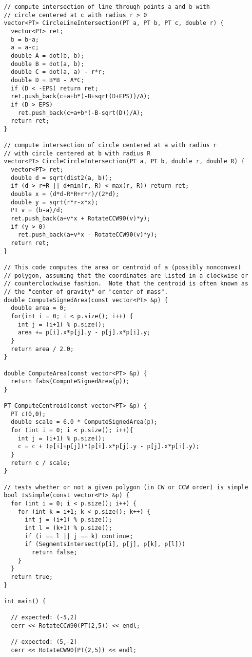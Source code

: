 \begin{lstlisting}
// compute intersection of line through points a and b with
// circle centered at c with radius r > 0
vector<PT> CircleLineIntersection(PT a, PT b, PT c, double r) {
  vector<PT> ret;
  b = b-a;
  a = a-c;
  double A = dot(b, b);
  double B = dot(a, b);
  double C = dot(a, a) - r*r;
  double D = B*B - A*C;
  if (D < -EPS) return ret;
  ret.push_back(c+a+b*(-B+sqrt(D+EPS))/A);
  if (D > EPS)
    ret.push_back(c+a+b*(-B-sqrt(D))/A);
  return ret;
}

// compute intersection of circle centered at a with radius r
// with circle centered at b with radius R
vector<PT> CircleCircleIntersection(PT a, PT b, double r, double R) {
  vector<PT> ret;
  double d = sqrt(dist2(a, b));
  if (d > r+R || d+min(r, R) < max(r, R)) return ret;
  double x = (d*d-R*R+r*r)/(2*d);
  double y = sqrt(r*r-x*x);
  PT v = (b-a)/d;
  ret.push_back(a+v*x + RotateCCW90(v)*y);
  if (y > 0)
    ret.push_back(a+v*x - RotateCCW90(v)*y);
  return ret;
}

// This code computes the area or centroid of a (possibly nonconvex)
// polygon, assuming that the coordinates are listed in a clockwise or
// counterclockwise fashion.  Note that the centroid is often known as
// the "center of gravity" or "center of mass".
double ComputeSignedArea(const vector<PT> &p) {
  double area = 0;
  for(int i = 0; i < p.size(); i++) {
    int j = (i+1) % p.size();
    area += p[i].x*p[j].y - p[j].x*p[i].y;
  }
  return area / 2.0;
}

double ComputeArea(const vector<PT> &p) {
  return fabs(ComputeSignedArea(p));
}

PT ComputeCentroid(const vector<PT> &p) {
  PT c(0,0);
  double scale = 6.0 * ComputeSignedArea(p);
  for (int i = 0; i < p.size(); i++){
    int j = (i+1) % p.size();
    c = c + (p[i]+p[j])*(p[i].x*p[j].y - p[j].x*p[i].y);
  }
  return c / scale;
}

// tests whether or not a given polygon (in CW or CCW order) is simple
bool IsSimple(const vector<PT> &p) {
  for (int i = 0; i < p.size(); i++) {
    for (int k = i+1; k < p.size(); k++) {
      int j = (i+1) % p.size();
      int l = (k+1) % p.size();
      if (i == l || j == k) continue;
      if (SegmentsIntersect(p[i], p[j], p[k], p[l])) 
        return false;
    }
  }
  return true;
}

int main() {
  
  // expected: (-5,2)
  cerr << RotateCCW90(PT(2,5)) << endl;
  
  // expected: (5,-2)
  cerr << RotateCW90(PT(2,5)) << endl;
  

\end{lstlisting}
